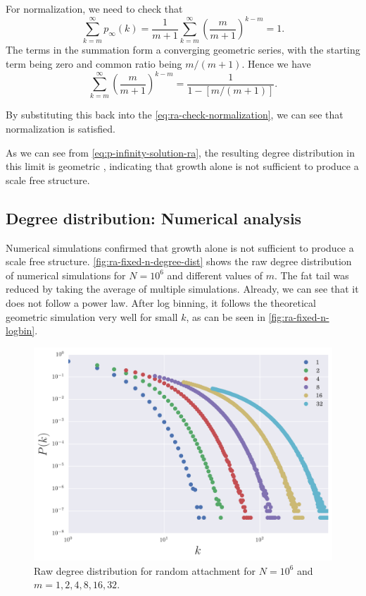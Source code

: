 For normalization, we need to check that 
\begin{equation}
	\sum_{k=m}^{\infty}p_{\infty}(k) = \frac{1}{m+1} \sum_{k=m}^{\infty} \left ( \frac{m}{m+1}\right )^{k-m} = 1.
	\label{eq:ra-check-normalization}
\end{equation}
The terms in the summation form a converging geometric series, with the starting term being zero and common ratio being $m / (m+1)$. Hence we have 
\begin{equation}
	\sum_{k=m}^{\infty} \left ( \frac{m}{m+1} \right )^{k-m} = \frac{1}{1 - [m / (m+1)]}. 
	\label{eq:ra-geom-series}
\end{equation}

By substituting this back into the \autoref{eq:ra-check-normalization}, we can see that normalization is satisfied. 

As we can see from \autoref{eq:p-infinity-solution-ra}, the resulting degree distribution in this limit is geometric \citep{Pekoz2013}, indicating that growth alone is not sufficient to produce a scale free structure. 

\subsection{Degree distribution: Numerical analysis}\label{subsection:ra-numerical-analysis}
Numerical simulations confirmed that growth alone is not sufficient to produce a scale free structure. \autoref{fig:ra-fixed-n-degree-dist} shows the raw degree distribution of numerical simulations for $N=10^6$ and different values of $m$. The fat tail was reduced by taking the average of multiple simulations. Already, we can see that it does not follow a power law. After log binning, it follows the theoretical geometric simulation very well for small $k$, as can be seen in \autoref{fig:ra-fixed-n-logbin}.

\begin{figure}
    \centering
    \includegraphics[height=0.5\linewidth]{img/ra-fixed-n-degree-dist}
    \caption{Raw degree distribution for random attachment for $N = 10^6$ and $m = 1, 2, 4, 8, 16, 32$. }
    \label{fig:ra-fixed-n-degree-dist}
\end{figure}

